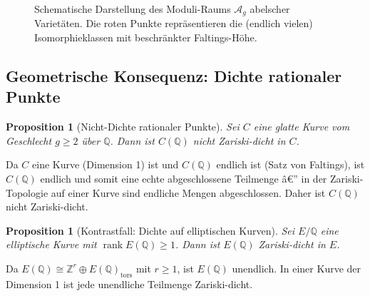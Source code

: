 ﻿\documentclass[12pt,a4paper]{article}
\theoremstyle{plain}
\newtheorem{proposition}[theorem]{Proposition}
\theoremstyle{definition}
\theoremstyle{remark}
\newenvironment{proof*}[1][Beweis]{%
  \begin{proof}[#1]\renewcommand{\qedsymbol}{$\blacksquare$}}
  {\end{proof}}
\newcommand{\Q}{\mathbb{Q}}
\newcommand{\Z}{\mathbb{Z}}
\DeclareMathOperator{\rank}{rank}
\begin{document}
\begin{figure}[H]
\centering
{}
\caption{Schematische Darstellung des Moduli-Raums $\mathcal{A}_g$ abelscher Varietäten.
  Die roten Punkte repräsentieren die (endlich vielen) Isomorphieklassen mit beschränkter
  Faltings-Höhe.}
\label{fig:moduli}
\end{figure}

\subsection{Geometrische Konsequenz: Dichte rationaler Punkte}

\begin{proposition}[Nicht-Dichte rationaler Punkte]\label{prop:nichtdichte}
Sei $C$ eine glatte Kurve vom Geschlecht $g \geq 2$ über $\Q$. Dann ist
$C(\Q)$ \emph{nicht Zariski-dicht} in $C$.
\end{proposition}

\begin{proof*}
Da $C$ eine Kurve (Dimension 1) ist und $C(\Q)$ endlich ist (Satz von Faltings),
ist $C(\Q)$ endlich und somit eine echte abgeschlossene Teilmenge â€” in der Zariski-Topologie
auf einer Kurve sind endliche Mengen abgeschlossen. Daher ist $C(\Q)$ nicht Zariski-dicht.
\end{proof*}

\begin{proposition}[Kontrastfall: Dichte auf elliptischen Kurven]\label{prop:dichte_ec}
Sei $E/\Q$ eine elliptische Kurve mit $\rank E(\Q) \geq 1$. Dann ist $E(\Q)$
Zariski-dicht in $E$.
\end{proposition}

\begin{proof*}
Da $E(\Q) \cong \Z^r \oplus E(\Q)_\mathrm{tors}$ mit $r \geq 1$, ist $E(\Q)$ unendlich.
In einer Kurve der Dimension 1 ist jede unendliche Teilmenge Zariski-dicht.
\end{proof*}
\end{document}
